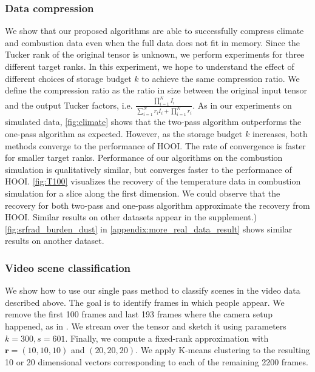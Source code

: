 \subsubsection{Data compression}
We show that our proposed algorithms are able to
successfully compress climate and combustion data
even when the full data does not fit in memory.
Since the Tucker rank of the original tensor is unknown, we perform experiments for
three different target ranks. In this experiment, we hope to understand the effect of different choices of storage budget $k$ to
 achieve the same compression ratio. We define the compression ratio
 as the ratio in size between the original input tensor and the output Tucker factors, i.e. $\frac{\prod_{i = 1}^N I_i}{\sum_{i=1}^Nr_iI_i+ \prod_{i = 1}^N r_i}$.
As in our experiments on simulated data, \ref{fig:climate} shows
that the two-pass algorithm outperforms the one-pass algorithm as expected.
However, as the storage budget $k$ increases, both methods converge to the performance of HOOI.
The rate of convergence is faster for smaller target ranks.
Performance of our algorithms on the combustion simulation is qualitatively similar,
but converges faster to the performance of HOOI. \ref{fig:T100} visualizes the recovery of
the temperature data in combustion simulation for a slice along the first dimension. We could observe that the
recovery for both two-pass and one-pass algorithm approximate the recovery from HOOI.
\ifdefined \issupplement
Similar results on other datasets appear in the supplement.)
\else
\ref{fig:srfrad_burden_dust} in \ref{appendix:more_real_data_result}
shows similar results on another dataset.
\fi

\subsubsection{Video scene classification}
We show how to use our single pass method to classify scenes in the video data described above.
The goal is to identify frames in which people appear.
We remove the first 100 frames and last 193 frames where the camera setup happened,
as in \cite{malik2018low}.
We stream over the tensor and sketch it using parameters $k = 300, s = 601$.
Finally, we compute a fixed-rank approximation with $\mathbf{r} = (10,10,10)$ and $(20,20,20)$.
We apply K-means clustering to the resulting 10 or 20 dimensional vectors
corresponding to each of the remaining 2200 frames.

